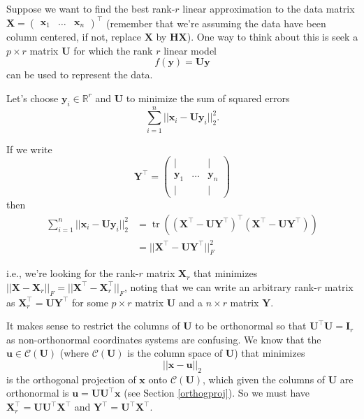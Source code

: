 \documentclass[
]{book}
\theoremstyle{definition}
\theoremstyle{definition}
\theoremstyle{definition}
\theoremstyle{definition}
\theoremstyle{remark}
\begin{document}
Suppose we want to find the best rank-\(r\) linear approximation to the data matrix \(\mathbf X=\begin{pmatrix}\mathbf x_1& \ldots & \mathbf x_n\end{pmatrix}^\top\) (remember that we're assuming the data have been column centered, if not, replace \(\mathbf X\) by \(\mathbf H\mathbf X\)). One way to think about this is seek a \(p\times r\) matrix \(\mathbf U\) for which the rank \(r\) linear model
\[f(\mathbf y) = \mathbf U\mathbf y\] can be used to represent the data.

Let's choose \(\mathbf y_i\in \mathbb{R}^r\) and \(\mathbf U\) to minimize the sum of squared errors
\[\sum_{i=1}^n ||\mathbf x_i - \mathbf U\mathbf y_i||^2_2.\]

If we write
\[\mathbf Y^\top = \begin{pmatrix} 
| &&|\\
\mathbf y_1& \ldots & \mathbf y_n\\
| &&|
\end{pmatrix}\]
then
\begin{align*}
\sum_{i=1}^n ||\mathbf x_i - \mathbf U\mathbf y_i||^2_2 &=\operatorname{tr}((\mathbf X^\top - \mathbf U\mathbf Y^\top)^\top (\mathbf X^\top - \mathbf U\mathbf Y^\top))\\
&=||\mathbf X^\top - \mathbf U\mathbf Y^\top||_F^2
\end{align*}

i.e., we're looking for the rank-\(r\) matrix \(\mathbf X_r\) that minimizes \(||\mathbf X- \mathbf X_r||_F=||\mathbf X^\top - \mathbf X_r^\top||_F\), noting that we can write an arbitrary rank-\(r\) matrix as \(\mathbf X_r^\top = \mathbf U\mathbf Y^\top\) for some \(p\times r\) matrix \(\mathbf U\) and a \(n \times r\) matrix \(\mathbf Y\).

It makes sense to restrict the columns of \(\mathbf U\) to be orthonormal so that \(\mathbf U^\top \mathbf U=\mathbf I_r\) as non-orthonormal coordinates systems are confusing. We know that the \(\mathbf u\in \mathcal{C}(\mathbf U)\) (where \(\mathcal{C}(\mathbf U)\) is the column space of \(\mathbf U\)) that minimizes
\[||\mathbf x-\mathbf u||_2\]
is the orthogonal projection of \(\mathbf x\) onto \(\mathcal{C}(\mathbf U)\), which given the columns of \(\mathbf U\) are orthonormal is \(\mathbf u= \mathbf U\mathbf U^\top \mathbf x\) (see Section \ref{orthogproj}). So we must have \(\mathbf X_r^\top = \mathbf U\mathbf U^\top \mathbf X^\top\) and \(\mathbf Y^\top = \mathbf U^\top \mathbf X^\top\).
\end{document}
